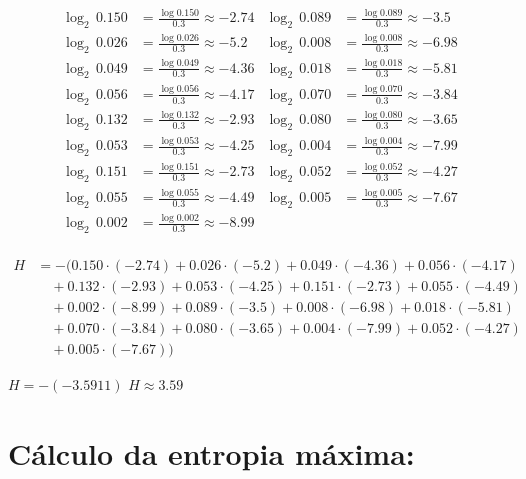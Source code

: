 \documentclass{article}
\begin{document}
\begin{align*}
\log_2 \, 0.150 &= \frac{\log 0.150}{0.3} \approx -2.74 & \log_2 \, 0.089 &= \frac{\log 0.089}{0.3} \approx -3.5 \\
\log_2 \, 0.026 &= \frac{\log 0.026}{0.3} \approx -5.2 & \log_2 \, 0.008 &= \frac{\log 0.008}{0.3} \approx -6.98 \\
\log_2 \, 0.049 &= \frac{\log 0.049}{0.3} \approx -4.36 & \log_2 \, 0.018 &= \frac{\log 0.018}{0.3} \approx -5.81 \\
\log_2 \, 0.056 &= \frac{\log 0.056}{0.3} \approx -4.17 & \log_2 \, 0.070 &= \frac{\log 0.070}{0.3} \approx -3.84 \\
\log_2 \, 0.132 &= \frac{\log 0.132}{0.3} \approx -2.93 & \log_2 \, 0.080 &= \frac{\log 0.080}{0.3} \approx -3.65 \\
\log_2 \, 0.053 &= \frac{\log 0.053}{0.3} \approx -4.25 & \log_2 \, 0.004 &= \frac{\log 0.004}{0.3} \approx -7.99 \\
\log_2 \, 0.151 &= \frac{\log 0.151}{0.3} \approx -2.73 & \log_2 \, 0.052 &= \frac{\log 0.052}{0.3} \approx -4.27 \\
\log_2 \, 0.055 &= \frac{\log 0.055}{0.3} \approx -4.49 & \log_2 \, 0.005 &= \frac{\log 0.005}{0.3} \approx -7.67 \\
\log_2 \, 0.002 &= \frac{\log 0.002}{0.3} \approx -8.99 \\
\end{align*}


\begin{align*}
    H &= - (0.150 \cdot (-2.74) + 0.026 \cdot (-5.2) + 0.049 \cdot (-4.36) + 0.056 \cdot (-4.17) \\
    &\quad + 0.132 \cdot (-2.93) + 0.053 \cdot (-4.25) + 0.151 \cdot (-2.73) + 0.055 \cdot (-4.49) \\
    &\quad + 0.002 \cdot (-8.99) + 0.089 \cdot (-3.5) + 0.008 \cdot (-6.98) + 0.018 \cdot (-5.81) \\
    &\quad + 0.070 \cdot (-3.84) + 0.080 \cdot (-3.65) + 0.004 \cdot (-7.99) + 0.052 \cdot (-4.27) \\
    &\quad + 0.005 \cdot (-7.67))
\end{align*}

$H = -(- 3.5911)$ \newline
$H \approx 3.59$\newline

\section{Cálculo da entropia máxima:}
\end{document}

